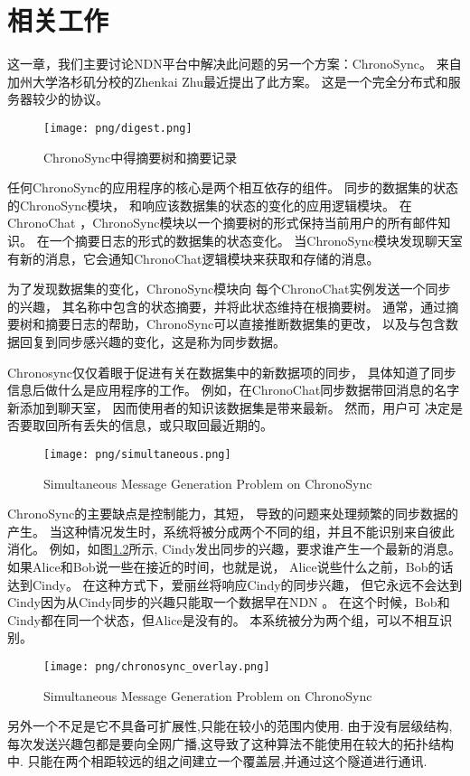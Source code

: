 \chapter{相关工作}



这一章，我们主要讨论NDN平台中解决此问题的另一个方案：ChronoSync。
来自加州大学洛杉矶分校的Zhenkai Zhu最近提出了此方案。
这是一个完全分布式和服务器较少的协议。

\begin{figure}
\centering
\texttt{[image: png/digest.png]}
\caption{ChronoSync中得摘要树和摘要记录}
\end{figure}

任何ChronoSync的应用程序的核心是两个相互依存的组件。
同步的数据集的状态的ChronoSync模块，
和响应该数据集的状态的变化的应用逻辑模块。
在ChronoChat ，ChronoSync模块以一个摘要树的形式保持当前用户的所有邮件知识。
在一个摘要日志的形式的数据集的状态变化。
当ChronoSync模块发现聊天室有新的消息，它会通知ChronoChat逻辑模块来获取和存储的消息。

为了发现数据集的变化，ChronoSync模块向
每个ChronoChat实例发送一个同步的兴趣，
其名称中包含的状态摘要，并将此状态维持在根摘要树。
通常，通过摘要树和摘要日志的帮助，ChronoSync可以直接推断数据集的更改，
以及与包含数据回复到同步感兴趣的变化，这是称为同步数据。

Chronosync仅仅着眼于促进有关在数据集中的新数据项的同步，
具体知道了同步信息后做什么是应用程序的工作。
例如，在ChronoChat同步数据带回消息的名字新添加到聊天室，
因而使用者的知识该数据集是带来最新。
然而，用户可 决定是否要取回所有丢失的信息，或只取回最近期的。

\begin{figure}
\centering
\texttt{[image: png/simultaneous.png]}
\caption{Simultaneous Message Generation Problem on ChronoSync}
\label{simultaneous}
\end{figure}

ChronoSync的主要缺点是控制能力，其短，
导致的问题来处理频繁的同步数据的产生。
当这种情况发生时，系统将被分成两个不同的组，并且不能识别来自彼此消化。
例如，如图\ref{simultaneous}所示,
Cindy发出同步的兴趣，要求谁产生一个最新的消息。
如果Alice和Bob说一些在接近的时间，也就是说，
Alice说些什么之前，Bob的话达到Cindy。
在这种方式下，爱丽丝将响应Cindy的同步兴趣，
但它永远不会达到Cindy因为从Cindy同步的兴趣只能取一个数据早在NDN 。
在这个时候，Bob和Cindy都在同一个状态，但Alice是没有的。
本系统被分为两个组，可以不相互识别。

\begin{figure}
\centering
\texttt{[image: png/chronosync\_overlay.png]}
\caption{Simultaneous Message Generation Problem on ChronoSync}
\label{simultaneous}
\end{figure}

另外一个不足是它不具备可扩展性,只能在较小的范围内使用.
由于没有层级结构,每次发送兴趣包都是要向全网广播,这导致了这种算法不能使用在较大的拓扑结构中.
只能在两个相距较远的组之间建立一个覆盖层,并通过这个隧道进行通讯.
